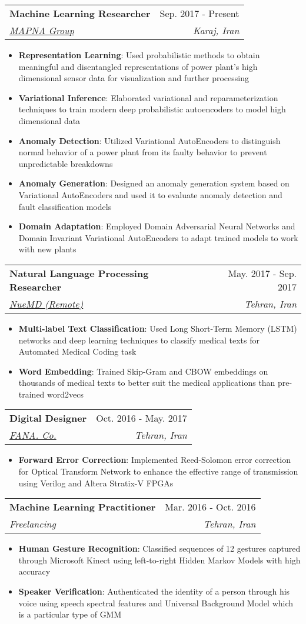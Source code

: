 \documentclass[letterpaper,11pt]{article}
\makeatletter
\newcommand{\resumeItem}[2]{
  \item\small{
    \textbf{#1}{: #2 \vspace{-2pt}}
  }
}
\newcommand{\resumeSubheading}[4]{
  \vspace{-1pt}\item
    \begin{tabular*}{0.97\textwidth}[t]{l@{\extracolsep{\fill}}r}
      \textbf{#1} & #2 \\
      \textit{\small#3} & \textit{\small #4} \\
    \end{tabular*}\vspace{-5pt}
}
\newcommand{\resumeItemListStart}{\begin{itemize}}
\newcommand{\resumeItemListEnd}{\end{itemize}\vspace{-5pt}}
\makeatother
\begin{document}
    \resumeSubheading
      {Machine Learning Researcher}{Sep. 2017 - Present}
      {\href{https://www.mapnagroup.com/en}{MAPNA Group}}{Karaj, Iran}
      \resumeItemListStart
        \resumeItem{Representation Learning}
          {Used probabilistic methods to obtain meaningful and disentangled representations of power plant's high dimensional sensor data for visualization and further processing}
        \resumeItem{Variational Inference}
          {Elaborated variational and reparameterization techniques to train modern deep probabilistic autoencoders to model high dimensional data}
        \resumeItem{Anomaly Detection}
          {Utilized Variational AutoEncoders to distinguish normal behavior of a power plant from its faulty behavior to prevent unpredictable breakdowns}
        \resumeItem{Anomaly Generation}
          {Designed an anomaly generation system based on Variational AutoEncoders and used it to evaluate anomaly detection and fault classification models}                    
        \resumeItem{Domain Adaptation}
          {Employed Domain Adversarial Neural Networks and Domain Invariant Variational AutoEncoders to adapt trained models to work with new plants}
      \resumeItemListEnd

    \resumeSubheading
      {Natural Language Processing Researcher}{May. 2017 - Sep. 2017}
      {\href{https://nuemd.com/}{NueMD (Remote)}}{Tehran, Iran}
      \resumeItemListStart
        \resumeItem{Multi-label Text Classification}
          {Used Long Short-Term Memory (LSTM) networks and deep learning techniques to classify medical texts for Automated Medical Coding task}
        \resumeItem{Word Embedding}
          {Trained Skip-Gram and CBOW embeddings on thousands of medical texts to better suit the medical applications than pre-trained word2vecs}
      \resumeItemListEnd

    \resumeSubheading
      {Digital Designer}{Oct. 2016 - May. 2017}
      {\href{http://www.fananet.com/indexEn.html}{FANA. Co.}}{Tehran, Iran}
      \resumeItemListStart
        \resumeItem{Forward Error Correction}
          {Implemented Reed-Solomon error correction for Optical Transform Network to enhance the effective range of transmission using Verilog and Altera Stratix-V FPGAs}
      \resumeItemListEnd

    \resumeSubheading
      {Machine Learning Practitioner}{Mar. 2016 - Oct. 2016}
      {Freelancing}{Tehran, Iran}
      \resumeItemListStart
        \resumeItem{Human Gesture Recognition}
          {Classified sequences of 12 gestures captured through Microsoft Kinect using left-to-right Hidden Markov Models with high accuracy}
        \resumeItem{Speaker Verification}
          {Authenticated the identity of a person through his voice using speech spectral features and Universal Background Model which is a particular type of GMM}
      \resumeItemListEnd
\end{document}
